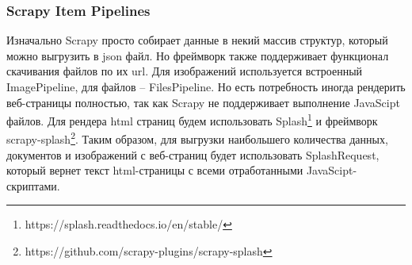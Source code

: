 \subsubsection{Scrapy Item Pipelines}  
Изначально Scrapy просто собирает данные в некий массив структур, который можно выгрузить в json файл. Но фреймворк также 
поддерживает функционал скачивания файлов по их url. Для изображений используется встроенный ImagePipeline, для файлов --
FilesPipeline. Но есть потребность иногда рендерить веб-страницы полностью, так как Scrapy не поддерживает выполнение JavaScipt
файлов. Для рендера html страниц будем использовать Splash\footnote{https://splash.readthedocs.io/en/stable/} и фреймворк 
scrapy-splash\footnote{https://github.com/scrapy-plugins/scrapy-splash}. Таким образом, для выгрузки наибольшего количества
данных, документов и изображений с веб-страниц будет использовать SplashRequest, который вернет текст html-страницы с всеми
отработанными JavaScipt-скриптами.